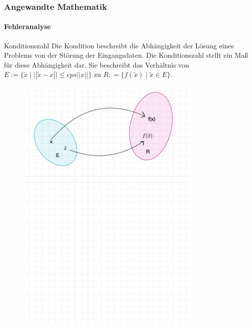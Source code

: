 \documentclass{beamer}
\begin{document}
\begin{frame}
    \frametitle{Angewandte Mathematik}
\framesubtitle{Fehleranalyse}
    \begin{block}{Konditionszahl}
 Die Kondition beschreibt  die Abhängigkeit der Lösung eines Problems von der Störung der Eingangsdaten.  Die Konditionszahl stellt ein Maß für diese Abhängigkeit dar. Sie beschreibt das Verhältnis von  $E:= \{\widetilde{x} \; | \; ||\widetilde{x} -x || \leq eps ||x|| \}$ zu $R: = \{f(\widetilde{x}) \; | \; \widetilde{x} \in E \}$.
\end{block}
\begin{figure}[H]
      \centering
    \includegraphics[width=0.8\textwidth]{images/kondition}
      \caption{}
\end{figure}

 \end{frame}
\end{document}
